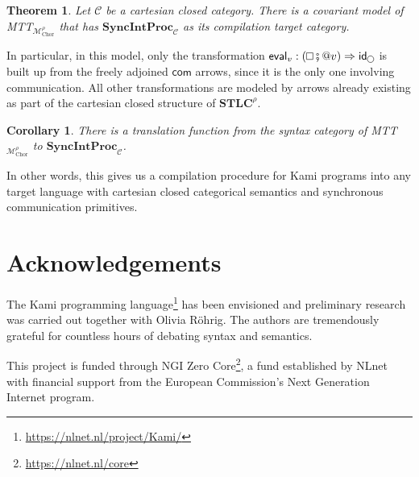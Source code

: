 \documentclass{scrartcl}
\theoremstyle{definition}
\theoremstyle{plain}
\newtheorem{theorem}{Theorem}
\newtheorem{corollary}{Corollary}
\renewcommand{\square}%
  {\tikz{\draw (0,0) rectangle (0.2cm,0.2cm);}}
\renewcommand{\circle}%
  {\tikz{\draw (0,0) circle [radius=0.1cm];}}
\begin{document}
\begin{theorem}
  Let $\mathcal{C}$ be a cartesian closed category. There is a covariant model
  of MTT${}_{\mathcal{M}^\rho_{\textrm{Chor}}}$ that has
  $\textbf{SyncIntProc}_{\mathcal{C}}$ as its compilation target category.
\end{theorem}
\vspace{0.5\baselineskip}
\noindent
In particular, in this model, only the transformation $\textsf{eval}_v :
(\square \fatsemi {}@ v) \Rightarrow \textsf{id}_{\circle}$ is built up from
the freely adjoined $\textsf{com}$ arrows, since it is the only one involving
communication. All other transformations are modeled by arrows already existing
as part of the cartesian closed structure of $\textbf{STLC}^\rho$.
\begin{corollary}
  There is a translation function from the syntax category of
  MTT${}_{\mathcal{M}^\rho_{\textrm{Chor}}}$ to
  $\textbf{SyncIntProc}_{\mathcal{C}}$.
\end{corollary}
\vspace{0.5\baselineskip}
\noindent
In other words, this gives us a compilation procedure for Kami programs into
any target language with cartesian closed categorical semantics and synchronous
communication primitives.

\section*{Acknowledgements}
The Kami programming language\footnote{\url{https://nlnet.nl/project/Kami/}}
has been envisioned and preliminary research was carried out
together with Olivia R\"ohrig. The authors are tremendously grateful for
countless hours of debating syntax and semantics.

This project is funded through NGI Zero
Core\footnote{\url{https://nlnet.nl/core}}, a fund established by NLnet with
financial support from the European Commission's Next Generation Internet
program.



\end{document}
